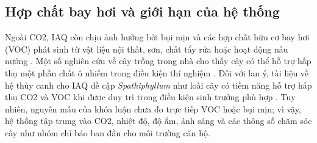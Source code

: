 \subsection{Hợp chất bay hơi và giới hạn của hệ thống}
Ngoài CO2, IAQ còn chịu ảnh hưởng bởi bụi mịn và các hợp chất hữu cơ bay hơi (VOC) phát sinh từ vật liệu nội thất, sơn, chất tẩy rửa hoặc hoạt động nấu nướng \cite{epa_iaq}. Một số nghiên cứu về cây trồng trong nhà cho thấy cây có thể hỗ trợ hấp thụ một phần chất ô nhiễm trong điều kiện thí nghiệm \cite{nasa_clean_air}. Đối với lan ý, tài liệu về hệ thủy canh cho IAQ đề cập \textit{Spathiphyllum} như loài cây có tiềm năng hỗ trợ hấp thụ CO2 và VOC khi được duy trì trong điều kiện sinh trưởng phù hợp \cite{hydroponic_iaq_survey}. Tuy nhiên, nguyên mẫu của khóa luận chưa đo trực tiếp VOC hoặc bụi mịn; vì vậy, hệ thống tập trung vào CO2, nhiệt độ, độ ẩm, ánh sáng và các thông số chăm sóc cây như nhóm chỉ báo ban đầu cho môi trường căn hộ.
